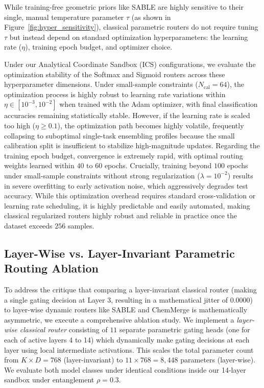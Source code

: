 While training-free geometric priors like SABLE are highly sensitive to their single, manual temperature parameter $\tau$ (as shown in Figure~\ref{fig:hyper_sensitivity}), classical parametric routers do not require tuning $\tau$ but instead depend on standard optimization hyperparameters: the learning rate ($\eta$), training epoch budget, and optimizer choice. 

Under our Analytical Coordinate Sandbox (ICS) configurations, we evaluate the optimization stability of the Softmax and Sigmoid routers across these hyperparameter dimensions. Under small-sample constraints ($N_{\text{cal}} = 64$), the optimization process is highly robust to learning rate variations within $\eta \in [10^{-3}, 10^{-2}]$ when trained with the Adam optimizer, with final classification accuracies remaining statistically stable. However, if the learning rate is scaled too high ($\eta \ge 0.1$), the optimization path becomes highly volatile, frequently collapsing to suboptimal single-task ensembling profiles because the small calibration split is insufficient to stabilize high-magnitude updates. Regarding the training epoch budget, convergence is extremely rapid, with optimal routing weights learned within $40$ to $60$ epochs. Crucially, training beyond $100$ epochs under small-sample constraints without strong regularization ($\lambda = 10^{-2}$) results in severe overfitting to early activation noise, which aggressively degrades test accuracy. While this optimization overhead requires standard cross-validation or learning rate scheduling, it is highly predictable and easily automated, making classical regularized routers highly robust and reliable in practice once the dataset exceeds $256$ samples.

\subsection{Layer-Wise vs. Layer-Invariant Parametric Routing Ablation}
\label{subsec:layerwise_ablation}

To address the critique that comparing a layer-invariant classical router (making a single gating decision at Layer 3, resulting in a mathematical jitter of $0.0000$) to layer-wise dynamic routers like SABLE and ChemMerge is mathematically asymmetric, we execute a comprehensive ablation study. We implement a \emph{layer-wise classical router} consisting of $11$ separate parametric gating heads (one for each of active layers 4 to 14) which dynamically make gating decisions at each layer using local intermediate activations. This scales the total parameter count from $K \times D = 768$ (layer-invariant) to $11 \times 768 = 8,448$ parameters (layer-wise). We evaluate both model classes under identical conditions inside our 14-layer sandbox under entanglement $\rho = 0.3$.

